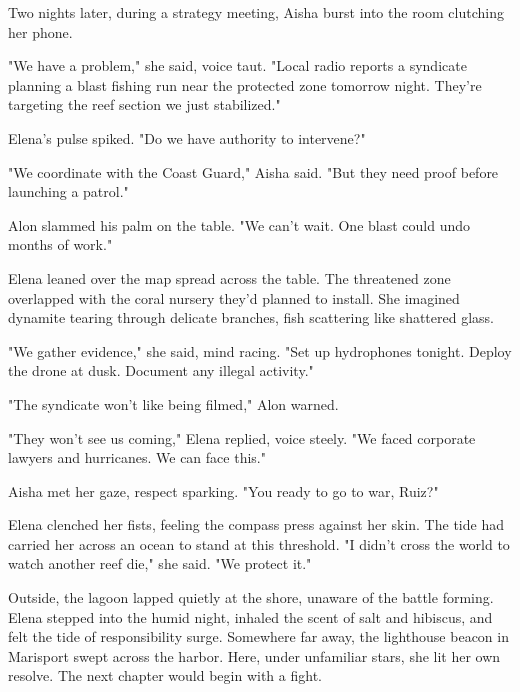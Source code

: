 \bigskip

Two nights later, during a strategy meeting, Aisha burst into the room clutching her phone.

"We have a problem," she said, voice taut. "Local radio reports a syndicate planning a blast fishing run near the protected zone tomorrow night. They're targeting the reef section we just stabilized."

Elena's pulse spiked. "Do we have authority to intervene?"

"We coordinate with the Coast Guard," Aisha said. "But they need proof before launching a patrol."

Alon slammed his palm on the table. "We can't wait. One blast could undo months of work."

Elena leaned over the map spread across the table. The threatened zone overlapped with the coral nursery they'd planned to install. She imagined dynamite tearing through delicate branches, fish scattering like shattered glass.

"We gather evidence," she said, mind racing. "Set up hydrophones tonight. Deploy the drone at dusk. Document any illegal activity."

"The syndicate won't like being filmed," Alon warned.

"They won't see us coming," Elena replied, voice steely. "We faced corporate lawyers and hurricanes. We can face this."

Aisha met her gaze, respect sparking. "You ready to go to war, Ruiz?"

Elena clenched her fists, feeling the compass press against her skin. The tide had carried her across an ocean to stand at this threshold. "I didn't cross the world to watch another reef die," she said. "We protect it."

Outside, the lagoon lapped quietly at the shore, unaware of the battle forming. Elena stepped into the humid night, inhaled the scent of salt and hibiscus, and felt the tide of responsibility surge. Somewhere far away, the lighthouse beacon in Marisport swept across the harbor. Here, under unfamiliar stars, she lit her own resolve. The next chapter would begin with a fight.
